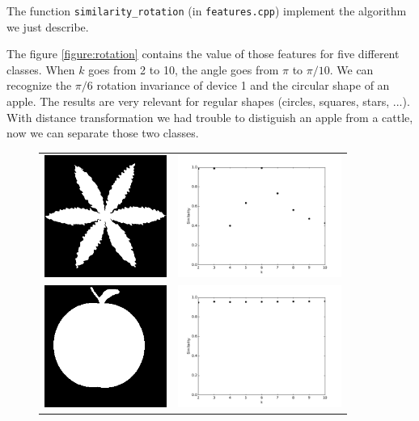 \documentclass[a4paper, 11pt]{article}
\begin{document}
\noindent The function \verb|similarity_rotation| (in \verb|features.cpp|) implement the algorithm we just describe.

\medskip\noindent The figure \ref{figure:rotation} contains the value of those features for five different classes. When $k$ goes from 2 to 10, the angle goes from $\pi$ to $\pi / 10$.
We can recognize the $\pi/6$ rotation invariance of device 1 and the circular shape of an apple.
The results are very relevant for regular shapes (circles, squares, stars, ...). With distance transformation we had trouble to distiguish an apple from a cattle, now we can separate those two classes.

\begin{figure}[p]
\centering
\begin{tabular}{ll}
\includegraphics[width=4cm]{device1.png} &
\includegraphics[height=4cm]{device1-rotation.pdf} \\
\includegraphics[width=4cm]{apple.png} &
\includegraphics[height=4cm]{apple-rotation.pdf} \\

\end{tabular}
\end{figure}
\end{document}
